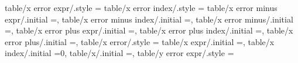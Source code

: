 {{{{{{{{{{{{{{{{{{{{{{{{{{{{{{{{{{{{{{{{{{{{{{{{{{{{table/x error expr/.style                                          ={                                                                                                                                  
table/x error index/.style                                         ={                                                                                                                                  
table/x error minus expr/.initial                                  =,                                                                                                                                  
table/x error minus index/.initial                                 =,                                                                                                                                  
table/x error minus/.initial                                       =,                                                                                                                                  
table/x error plus expr/.initial                                   =,                                                                                                                                  
table/x error plus index/.initial                                  =,                                                                                                                                  
table/x error plus/.initial                                        =,                                                                                                                                  
table/x error/.style                                               ={                                                                                                                                  
table/x expr/.initial                                              =,                                                                                                                                  
table/x index/.initial                                             =0,                                                                                                                                 
table/x/.initial                                                   =,                                                                                                                                  
table/y error expr/.style                                          ={                                                                                                                                  
}}}}}}}}}}}}}}}}}}}}}}}}}}}}}}}}}}}}}}}}}}}}}}}}}}}}}}}}
